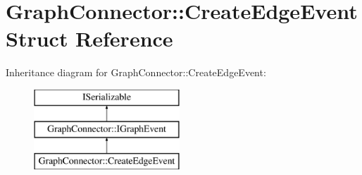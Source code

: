 \hypertarget{struct_graph_connector_1_1_create_edge_event}{}\section{Graph\+Connector\+:\+:Create\+Edge\+Event Struct Reference}
\label{struct_graph_connector_1_1_create_edge_event}
Inheritance diagram for Graph\+Connector\+:\+:Create\+Edge\+Event\+:\begin{figure}[H]
\begin{center}
\leavevmode
\includegraphics[height=3.000000cm]{struct_graph_connector_1_1_create_edge_event}
\end{center}
\end{figure}
